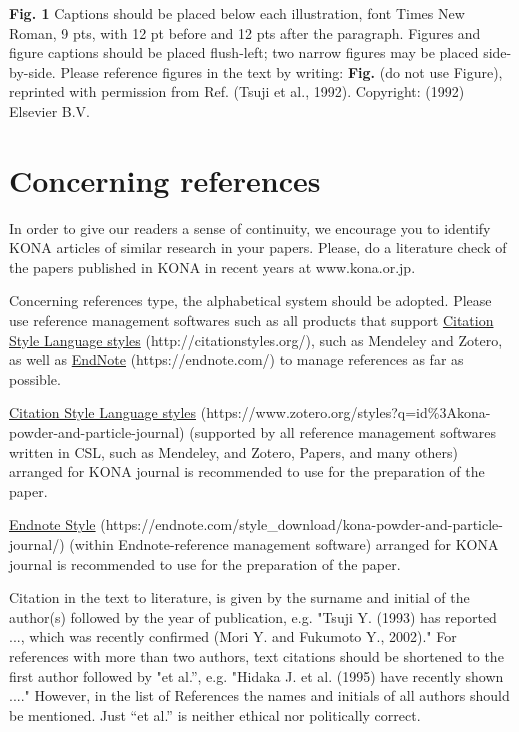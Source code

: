 \documentclass[twocolumn, 10pt]{article}
\begin{document}
\textbf{Fig. 1 } Captions should be placed below each illustration, font Times New Roman, 9 pts, with 12 pt before and 12 pts after the paragraph. Figures and figure captions should be placed flush-left; two narrow figures may be placed side-by-side. Please reference figures in the text by writing: \textbf{Fig. }(do not use Figure)\textellipsis , reprinted with permission from Ref. (Tsuji et al., 1992). Copyright: (1992) Elsevier B.V.


\section{Concerning references }

In order to give our readers a sense of continuity, we encourage you to identify KONA articles of similar research in your papers. Please, do a literature check of the papers published in KONA in recent years at www.kona.or.jp.

Concerning references type, the alphabetical system should be adopted. Please use reference management softwares such as all products that support \underline{Citation Style Language styles} {\small (http://citationstyles.org/)}, such as Mendeley and Zotero, as well as \underline{EndNote} {\small (https://endnote.com/)} to manage references as far as possible.

\underline{Citation Style Language styles} {\small (https://www.\linebreak[2]zotero.org/styles?q=id\%3Akona-powder-and-particle-journal)} (supported by all reference management softwares written in CSL, such as Mendeley, and Zotero, Papers, and many others) arranged for KONA journal is recommended to use for the preparation of the paper.

\underline{Endnote Style} {\small (https://endnote.com/style\_download/\linebreak[2]kona-powder-and-particle-journal/)} (within Endnote-reference management software) arranged for KONA journal is recommended to use for the preparation of the paper.

Citation in the text to literature, is given by the surname and initial of the author(s) followed by the year of publication, e.g. "Tsuji Y. (1993) has reported ..., which was recently confirmed (Mori Y. and Fukumoto Y., 2002)." For references with more than two authors, text citations should be shortened to the first author followed by "et al.'', e.g. "Hidaka J. et al. (1995) have recently shown ...." However, in the list of References the names and initials of all authors should be mentioned. Just ``et al.'' is neither ethical nor politically correct.
\end{document}
